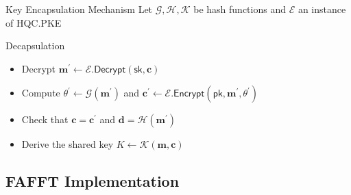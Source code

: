 \begin{frame}{Key Encapsulation Mechanism}
    Let $\mathcal{G, H, K}$ be hash functions and $\mathcal{E}$ an instance of \textsf{HQC.PKE}
    \begin{block}{Decapsulation}
        \begin{itemize}
            \item Decrypt $\mathbf{m}^{'} \leftarrow \mathcal{E}.\textsf{Decrypt}(\textsf{sk}, \mathbf{c})$
            \item Compute $\theta^{'} \leftarrow \mathcal{G}(\mathbf{m}^{'})$ and $\mathbf{c}^{'} \leftarrow \mathcal{E}.\textsf{Encrypt}(\textsf{pk}, \mathbf{m}^{'}, \theta^{'})$
            \item Check that $\mathbf{c = c^{'}}$ and $\mathbf{d} = \mathcal{H}(\mathbf{m}^{'})$
            \item Derive the shared key $K \leftarrow \mathcal{K}(\mathbf{m, c})$
        \end{itemize}
    \end{block}
\end{frame}

\subsection{FAFFT Implementation}
\begin{frame}{}
    \subsectionpage
\end{frame}

